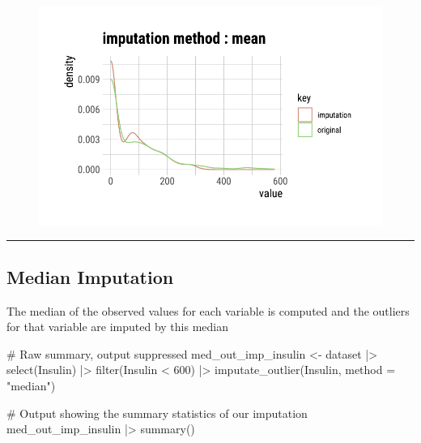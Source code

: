 \documentclass[
  letterpaper,
  DIV=11,
  numbers=noendperiod]{scrreprt}
\newenvironment{Shaded}{\begin{snugshade}}{\end{snugshade}}
\newcommand{\AttributeTok}[1]{\textcolor[rgb]{0.40,0.45,0.13}{#1}}
\newcommand{\CommentTok}[1]{\textcolor[rgb]{0.37,0.37,0.37}{#1}}
\newcommand{\DecValTok}[1]{\textcolor[rgb]{0.68,0.00,0.00}{#1}}
\newcommand{\FunctionTok}[1]{\textcolor[rgb]{0.28,0.35,0.67}{#1}}
\newcommand{\NormalTok}[1]{\textcolor[rgb]{0.00,0.23,0.31}{#1}}
\newcommand{\OtherTok}[1]{\textcolor[rgb]{0.00,0.23,0.31}{#1}}
\newcommand{\SpecialCharTok}[1]{\textcolor[rgb]{0.37,0.37,0.37}{#1}}
\newcommand{\StringTok}[1]{\textcolor[rgb]{0.13,0.47,0.30}{#1}}
\begin{document}
\begin{figure}[H]

{\centering \includegraphics{./ImputatingLikeDataScientist_files/figure-pdf/unnamed-chunk-12-1.pdf}

}

\end{figure}

\begin{center}\rule{0.5\linewidth}{0.5pt}\end{center}

\hypertarget{median-imputation}{%
\subsection{Median Imputation}\label{median-imputation}}

The median of the observed values for each variable is computed and the
outliers for that variable are imputed by this median

\begin{Shaded}
\begin{Highlighting}[]
\CommentTok{\# Raw summary, output suppressed}
\NormalTok{med\_out\_imp\_insulin }\OtherTok{\textless{}{-}}\NormalTok{ dataset }\SpecialCharTok{|\textgreater{}}
  \FunctionTok{select}\NormalTok{(Insulin) }\SpecialCharTok{|\textgreater{}}
  \FunctionTok{filter}\NormalTok{(Insulin }\SpecialCharTok{\textless{}} \DecValTok{600}\NormalTok{) }\SpecialCharTok{|\textgreater{}}
  \FunctionTok{imputate\_outlier}\NormalTok{(Insulin, }\AttributeTok{method =} \StringTok{"median"}\NormalTok{)}

\CommentTok{\# Output showing the summary statistics of our imputation}
\NormalTok{med\_out\_imp\_insulin }\SpecialCharTok{|\textgreater{}}
  \FunctionTok{summary}\NormalTok{()}
\end{Highlighting}
\end{Shaded}
\end{document}
